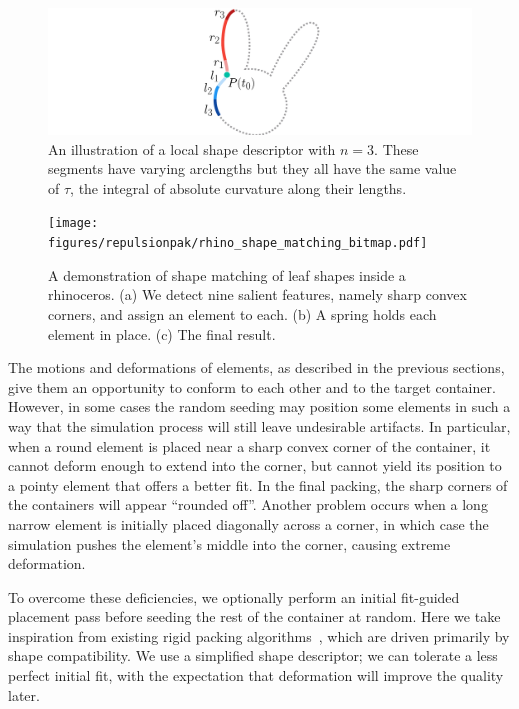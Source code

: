 \begin{figure}[t]
\centering
\includegraphics[width=1.0\textwidth]{figures/repulsionpak/descriptor_2.pdf}
\caption[A local shape descriptor for shape matching]
{\label{fig_shape_matching}
An illustration of a local shape descriptor with $n = 3$. 
These segments have varying arclengths but they all have the same value
of $\tau$, the integral of absolute curvature along their lengths.
}
\end{figure}
\begin{figure}
\centering
\texttt{[image: figures/repulsionpak/rhino\_shape\_matching\_bitmap.pdf]} 
\caption[A demonstration of shape matching of leaf shapes inside a rhinoceros]
{\label{rhino_packing}
{ 
A demonstration of shape matching of leaf shapes inside a rhinoceros. 
(a) We detect nine salient features, namely sharp convex corners, and 
assign an element to each.
(b) A spring holds each element in place.
(c) The final result.
}
}
\end{figure}

The motions and deformations of elements, as described
in the previous sections, give them an opportunity to conform to each 
other and to the target container.  However, in some cases the random 
seeding may position some elements in such a way that the simulation 
process will still leave undesirable artifacts.  In particular, when
a round element is placed near a sharp convex corner of the container,
it cannot deform enough to extend into the corner, but cannot yield its
position to a pointy element that offers a better fit.  In the final
packing, the sharp corners of the containers will appear ``rounded off''.
Another problem occurs when a long narrow element is initially placed diagonally across a corner, 
in which case the simulation pushes the element's middle into the corner, causing extreme deformation.

To overcome these deficiencies, we optionally perform an initial fit-guided
placement pass before seeding the rest of the container at random. 
Here we take inspiration from existing rigid packing 
algorithms~\cite{Kwan2016}, which are driven primarily by shape 
compatibility.  We use a simplified shape descriptor; we can tolerate
a less perfect initial fit, with the expectation that deformation will
improve the quality later.

